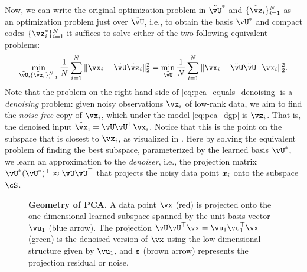 \documentclass[../../book-main.tex]{subfiles}
\begin{document}
Now, we can write the original optimization problem in \(\tilde{\vU}^{\ast}\) and \(\{\tilde{\vz}_{i}\}_{i = 1}^{N}\) as an optimization problem just over \(\tilde{\vU}\), i.e., to obtain the basis \(\vU^{\ast}\) and compact codes \(\{\vz_{i}^{\ast}\}_{i = 1}^{N}\) it suffices to solve either of the two following equivalent problems:
\begin{equation}\label{eq:pca_equals_denoising}
    \min_{\tilde{\vU}, \{\tilde{\vz}_{i}\}_{i = 1}^{N}}\frac{1}{N}\sum_{i = 1}^{N}\norm{\vx_{i} - \tilde{\vU}\tilde{\vz}_{i}}_{2}^{2} = \min_{\tilde{\vU}}\frac{1}{N}\sum_{i = 1}^{N}\norm{\vx_{i} - \tilde{\vU}\tilde{\vU}^{\top}\vx_{i}}_{2}^{2}.
\end{equation}
Note that the problem on the right-hand side of \eqref{eq:pca_equals_denoising}
is a \textit{denoising} problem: given noisy observations \(\vx_{i}\) of
low-rank data, we aim to find the \textit{noise-free} copy of \(\vx_{i}\), which
under the model \eqref{eq:pca_dgp} is $\vz_{i}$. That is, the denoised input $\hat{\vx}_i = \vU\vU^\top \vx_i$. Notice that this is the point on the subspace that is closest to $\vx_i$, as visualized in . Here by solving the equivalent problem of finding the best subspace, parameterized by the learned basis \(\vU^{\ast}\), we learn an approximation to the \textit{denoiser}, i.e., the projection matrix \(\vU^{\ast}(\vU^{\ast})^{\top} \approx \vU\vU^{\top}\) that projects the noisy data point $\bm{x}_i$ onto the subspace \(\cS\). %

\begin{figure}
    \centering
    \caption{\small \textbf{Geometry of PCA.} A data point $\vx$ (red) is projected onto the one-dimensional learned subspace spanned by the unit basis vector $\vu_1$ (blue arrow). The projection $\vU\vU^\top\vx = \vu_{1}\vu_{1}^{\top}\vx$ (green) is the denoised version of $\vx$ using the low-dimensional structure given by $\vu_{1}$, and $\boldsymbol{\varepsilon}$ (brown arrow) represents the projection residual or noise.}
    \label{fig:pca-geometry}
\end{figure}
\end{document}
